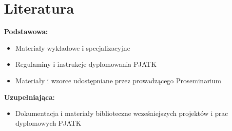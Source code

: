 \documentclass[12pt, a4paper]{article}
\begin{document}
\section{Literatura}

\textbf{Podstawowa:}
\begin{itemize}
  \item Materiały wykładowe i specjalizacyjne
  \item Regulaminy i instrukcje dyplomowania PJATK
  \item Materiały i wzorce udostępniane przez prowadzącego Proseminarium
\end{itemize}

\textbf{Uzupełniająca:}
\begin{itemize}
  \item Dokumentacja i materiały biblioteczne wcześniejszych projektów i prac dyplomowych PJATK
\end{itemize}
\end{document}
